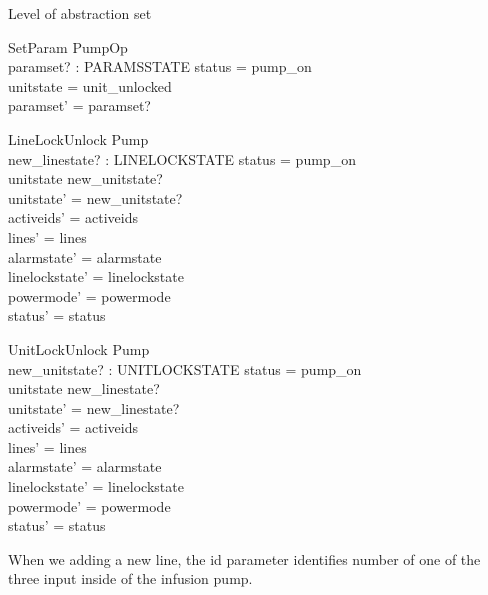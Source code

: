 \documentclass{article}
\begin{document}
	Level of abstraction set 
	\begin{schema}{SetParam}
		PumpOp \\
		paramset? : PARAMSSTATE 
	\where
		status = pump\_on \\ 
		unitstate = unit\_unlocked \\
		paramset' = paramset?
	\end{schema}
	
    \begin{schema}{LineLockUnlock}
		\Delta Pump \\
		new\_linestate? : LINELOCKSTATE
	\where
		status = pump\_on \\ 
		unitstate \neq new\_unitstate? \\
		unitstate' = new\_unitstate? \\	
		activeids' = activeids \\
    	lines' = lines  \\
    	alarmstate' = alarmstate \\
    	linelockstate' = linelockstate  \\
    	powermode' = powermode \\
    	status' = status \\	
	\end{schema}
	
    \begin{schema}{UnitLockUnlock}
		\Delta Pump \\
		new\_unitstate? : UNITLOCKSTATE
	\where
		status = pump\_on \\ 
		unitstate \neq new\_linestate? \\
		unitstate' = new\_linestate? \\
		activeids' = activeids \\
    	lines' = lines  \\
    	alarmstate' = alarmstate \\
    	linelockstate' = linelockstate  \\
    	powermode' = powermode \\
    	status' = status \\
	\end{schema} 	
	
	When we adding a new line, the id parameter identifies number of 
	one of the three input inside of the infusion pump.
\end{document}
